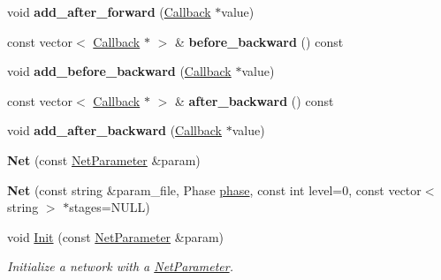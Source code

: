 \begin{DoxyCompactItemize}
void {\bfseries add\+\_\+after\+\_\+forward} (\mbox{\hyperlink{classcaffe_1_1_net_1_1_callback}{Callback}} $\ast$value)
\item 
\mbox{\label{classcaffe_1_1_net_a56eb610394b69214ff9e4d6672c307bb}} 
const vector$<$ \mbox{\hyperlink{classcaffe_1_1_net_1_1_callback}{Callback}} $\ast$ $>$ \& {\bfseries before\+\_\+backward} () const
\item 
\mbox{\label{classcaffe_1_1_net_aed8cfa1dd96bef7fc39c232623995687}} 
void {\bfseries add\+\_\+before\+\_\+backward} (\mbox{\hyperlink{classcaffe_1_1_net_1_1_callback}{Callback}} $\ast$value)
\item 
\mbox{\label{classcaffe_1_1_net_a331192ceb7cebfbe83177d00e98c67cc}} 
const vector$<$ \mbox{\hyperlink{classcaffe_1_1_net_1_1_callback}{Callback}} $\ast$ $>$ \& {\bfseries after\+\_\+backward} () const
\item 
\mbox{\label{classcaffe_1_1_net_a29a94f00de415c11ee57b0985c255827}} 
void {\bfseries add\+\_\+after\+\_\+backward} (\mbox{\hyperlink{classcaffe_1_1_net_1_1_callback}{Callback}} $\ast$value)
\item 
\mbox{\label{classcaffe_1_1_net_a5a5655a49c702c6c4a2f5bd7bf7adf12}} 
{\bfseries Net} (const \mbox{\hyperlink{classcaffe_1_1_net_parameter}{Net\+Parameter}} \&param)
\item 
\mbox{\label{classcaffe_1_1_net_ac42c11d2fa9546421d6c5cd7f83330b3}} 
{\bfseries Net} (const string \&param\+\_\+file, Phase \mbox{\hyperlink{classcaffe_1_1_net_a9418aee447ff6e847fd1a5e7be3d7a44}{phase}}, const int level=0, const vector$<$ string $>$ $\ast$stages=N\+U\+LL)
\item 
\mbox{\label{classcaffe_1_1_net_ae9fcfaabc89165d6c0cb4b14b4c6b584}} 
void \mbox{\hyperlink{classcaffe_1_1_net_ae9fcfaabc89165d6c0cb4b14b4c6b584}{Init}} (const \mbox{\hyperlink{classcaffe_1_1_net_parameter}{Net\+Parameter}} \&param)
\begin{DoxyCompactList}\small\item\em Initialize a network with a \mbox{\hyperlink{classcaffe_1_1_net_parameter}{Net\+Parameter}}. \end{DoxyCompactList}\item 

\end{DoxyCompactItemize}
